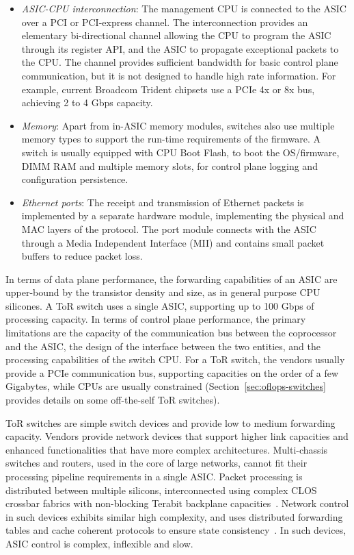 \begin{itemize}
  \item \emph{ASIC-CPU interconnection}: The management CPU is connected to the ASIC
    over a PCI or PCI-express channel. The interconnection provides an
    elementary bi-directional channel allowing the CPU to program the ASIC
    through its register API, and the ASIC to propagate exceptional packets to
    the CPU\@. The channel provides sufficient bandwidth for basic control plane
    communication, but it is not designed to handle high rate information. For
    example, current Broadcom Trident chipsets use a PCIe 4x or 8x bus,
    achieving 2 to 4 Gbps capacity.  

  \item \emph{Memory}: Apart from in-ASIC memory modules, switches
    also use multiple memory types to support the run-time requirements of the
    firmware. A switch is usually equipped with CPU Boot Flash, to boot the
    OS/firmware, DIMM RAM and multiple memory slots, for control plane logging
    and configuration persistence.

  \item \emph{Ethernet ports}: The receipt and transmission of Ethernet packets
    is implemented by a separate hardware module, 
    implementing the physical and MAC layers of the protocol. The port module 
    connects with the  ASIC through a Media Independent Interface (MII) and
    contains small packet buffers to reduce packet loss.  
\end{itemize}

In terms of data plane performance,  the forwarding capabilities of an ASIC are
upper-bound by the transistor density and size, as in general purpose CPU
silicones. A ToR switch uses a single ASIC, supporting up to 100 Gbps of processing
capacity.  In terms of control plane performance, the primary limitations are the
capacity of the communication bus between the coprocessor and the ASIC, the
design of the interface between the two entities, and the processing capabilities
of the switch CPU\@.  For a ToR switch, the vendors usually provide a PCIe
communication bus, supporting capacities on the order of a few Gigabytes, while
CPUs are usually constrained (Section~\ref{sec:oflops-switches} provides details
on some off-the-self ToR switches).

ToR switches are simple switch devices and provide low to medium forwarding
capacity. Vendors provide network devices that support higher link capacities and
enhanced functionalities that have more complex architectures. Multi-chassis
switches and routers, used in the core of large networks, cannot fit their
processing pipeline requirements in a single ASIC\@.  Packet processing is
distributed between multiple silicons, interconnected using complex CLOS
crossbar fabrics with non-blocking Terabit backplane
capacities~. Network control in such devices exhibits
similar high complexity, and uses distributed forwarding tables and cache
coherent protocols to ensure state consistency~. In such
devices, ASIC control is complex, inflexible and slow.  

